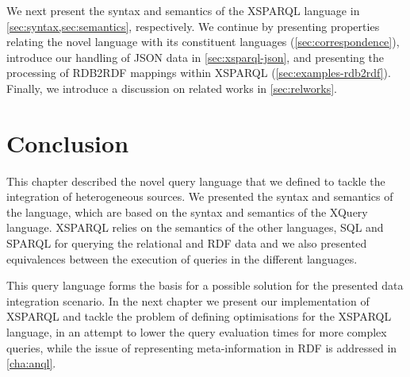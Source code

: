 

\bigskip 
%
We next present the syntax and semantics of the XSPARQL language in \cref{sec:syntax,sec:semantics}, respectively.  We
continue by presenting properties relating the novel language with its constituent languages
(\cref{sec:correspondence}), introduce our handling of \ac{JSON} data in \cref{sec:xsparql-json}, and presenting the
processing of RDB2RDF mappings within XSPARQL (\cref{sec:examples-rdb2rdf}).
%
Finally, we introduce a discussion on related works in \cref{sec:relworks}.
















\section{Conclusion}
\label{sec:xsparql-conclusions}

This chapter described the novel query language that we defined to tackle the integration of heterogeneous sources.  We
presented the syntax and semantics of the language, which are based on the syntax and semantics of the XQuery language.
% 
XSPARQL relies on the semantics of the other languages, \ac{SQL} and SPARQL for querying the relational and \ac{RDF}
data and we also presented equivalences between the execution of queries in the different languages.

This query language forms the basis for a possible solution for the presented data integration scenario.
%
In the next chapter we present our implementation of XSPARQL and tackle the problem of defining optimisations for the
XSPARQL language, in an attempt to lower the query evaluation times for more complex queries, while the issue of
representing meta-information in \ac{RDF} is addressed in \cref{cha:anql}.



